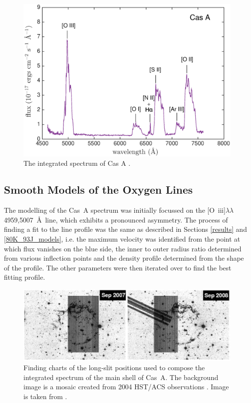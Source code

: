 \begin{figure}
\centering
\includegraphics[clip=true,scale=0.6, trim=30 0 50 20]{chapters/chapter6/figs/CasA/spectrum}
\caption{The integrated spectrum of Cas A \citep{Milisavljevic2013}.}
\label{CasA_spectrum}
\end{figure}

\subsection{Smooth Models of the Oxygen Lines}
\label{scn:CasA_smooth}
The modelling of the Cas~A spectrum was initially focussed on the [O~{\sc iii}]$\lambda\lambda$4959,5007~\AA\  line, which exhibits a pronounced asymmetry.  The process of finding a fit to the line profile was the same as described in Sections \ref{results} and \ref{80K_93J_models}, i.e. the maximum velocity was identified from the point at which flux vanishes on the blue side, the inner to outer radius ratio determined from various inflection points and the density profile determined from the shape of the profile.  The other parameters were then iterated over to find the best fitting profile.  

\begin{figure}
\centering
\includegraphics[clip=true,scale=0.3, trim=0 0 0 0]{chapters/chapter6/figs/CasA/slit_positions.png}
\caption{Finding charts of the long-slit positions used to compose the integrated spectrum of the main shell of Cas~A.  The background image is a mosaic created from 2004 HST/ACS observations \citep{Fesen2006a}.  Image is taken from \citet{Milisavljevic2013}.}
\label{CasA_slit_positions}
\end{figure}

